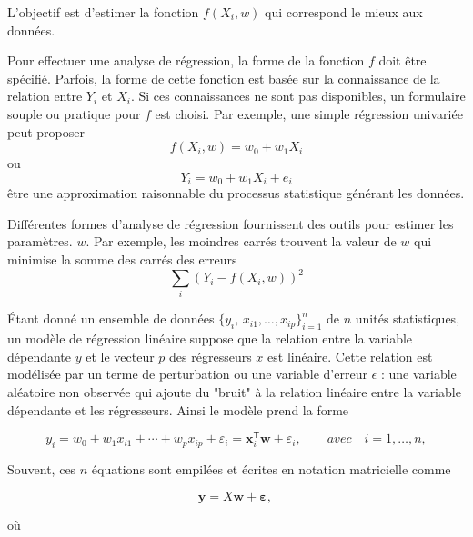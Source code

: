 		L'objectif est d'estimer la fonction ${\displaystyle f(X_{i},w )}$ qui correspond le mieux aux données.
		
		Pour effectuer une analyse de régression, la forme de la fonction $f$ doit être spécifié. Parfois, la forme de cette fonction est basée sur la connaissance de la relation entre $Y_{i}$ et $X_{i}$. 
		Si ces connaissances ne sont pas disponibles, un formulaire souple ou pratique pour $f$ est choisi. Par exemple, une simple régression univariée peut proposer
		 $${\displaystyle f(X_{i},w )= w_{0}+ w_{1}X_{i}}$$
		ou
		 $${\displaystyle Y_{i}= w_{0}+ w_{1}X_{i}+e_{i}}$$
		être une approximation raisonnable du processus statistique générant les données.
		 
		 Différentes formes d'analyse de régression fournissent des outils pour estimer les paramètres. $w$. Par exemple, les moindres carrés trouvent la valeur de $w$ qui minimise la somme des carrés des erreurs \cite{deepa2021ai} $${\sum _{i}(Y_{i}-f(X_{i},w ))^{2}}$$ 
		 
		 Étant donné un ensemble de données ${\displaystyle \{y_{i},\,x_{i1},\ldots ,x_{ip}\}_{i=1}^{n}}$ de $n$ unités statistiques, un modèle de régression linéaire suppose que la relation entre la variable dépendante $y$ et le vecteur $p$ des régresseurs $x$ est linéaire. Cette relation est modélisée par un terme de perturbation ou une variable d'erreur $\epsilon$ : une variable aléatoire non observée qui ajoute du "bruit" à la relation linéaire entre la variable dépendante et les régresseurs. Ainsi le modèle prend la forme
		 
		$${\displaystyle y_{i}=w _{0}+w _{1}x_{i1}+\cdots +w _{p}x_{ip}+\varepsilon _{i}=\mathbf { x} _{i}^{\mathsf {T}}{\boldsymbol {w }}+\varepsilon_{i},\qquad avec \quad i=1,\ldots ,n,}
		$$
		
		Souvent, ces $n$ équations sont empilées et écrites en notation matricielle comme
		
		$$
		{\displaystyle \mathbf {y} =X{\boldsymbol {w}}+{\boldsymbol {\varepsilon}},\,}
		$$
		
		où
		

